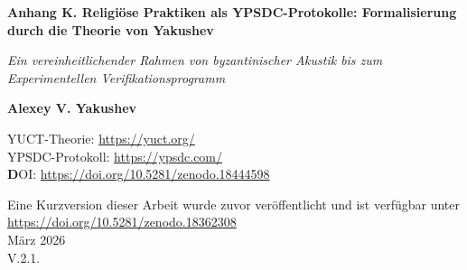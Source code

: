 \documentclass[12pt,a4paper]{article}
\begin{document}
	
	\begin{titlepage}
		\begin{center}
			\vspace*{0cm}
			
			\Huge\textbf{Anhang K. Religiöse Praktiken als YPSDC-Protokolle: Formalisierung durch die Theorie von Yakushev}
			
			\vspace{1cm}
			
			\small\textit{Ein vereinheitlichender Rahmen von byzantinischer Akustik bis zum Experimentellen Verifikationsprogramm}
			
			\vspace{0.5cm}
			
			\small\textbf{Alexey V. Yakushev}
			
			\vspace{0cm}
			
			YUCT-Theorie: \url{https://yuct.org/}\\
			YPSDC-Protokoll: \url{https://ypsdc.com/}\\
			
			
			\vspace{2cm}
			\textbf DOI: \url{https://doi.org/10.5281/zenodo.18444598}\\
			
			\vspace{1cm}
			
			\vspace{0cm}
			\large 
			Eine Kurzversion dieser Arbeit wurde zuvor veröffentlicht und ist verfügbar unter\\ \url{https://doi.org/10.5281/zenodo.18362308}\\
			\vspace{1cm}
			März 2026 \\ \large V.2.1.
			\newpage
			\begin{abstract}
				\noindent
				Dieses Dokument präsentiert eine umfassende Formalisierung religiöser Praktiken durch die Linse der Yakushev Unified Coordination Theory (YUCT) und des YPSDC-Protokolls (Yakushev Protocol for Synchronous Distributed Coordination). Teil 1 zeigt, wie religiöse Rituale als hochoptimierte Koordinationsprotokolle unter Verwendung vorverteilter Wörterbücher fungieren, wobei die byzantinische Kirchenakustik als paradigmatisches Beispiel für architektonische Optimierung der Koordinationseffizienz dient. Teil 2 skizziert die extreme Vereinheitlichungskraft des YUCT-Rahmens und präsentiert ein detailliertes Forschungsprogramm zur experimentellen Verifikation, wobei die Studentenforschung als Eckpfeiler der wissenschaftlichen Validierung betont wird. Der Rahmen liefert messbare Metriken ($K_{\mathrm{eff}}$), testbare Vorhersagen und interdisziplinäre Anwendungen von der Physik und Biologie bis zur Soziologie und Religionswissenschaft.
			\end{abstract}
			

\end{center}
\end{titlepage}
\end{document}
